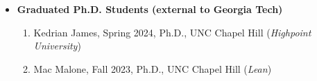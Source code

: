 \documentclass[11pt]{article}
\newcommand{\ignore}[1]{}
\newcommand{\bibgap}{\vspace{0.3\baselineskip}}
\begin{document}
\begin{itemize}
\begin{itemize}
\bibgap
\item {\bf Graduated Ph.D. Students (external to Georgia Tech)}
\begin{enumerate}
	\item Kedrian James, Spring 2024, Ph.D., UNC Chapel Hill ({\it Highpoint University})
	\item Mac Malone, Fall 2023, Ph.D., UNC Chapel Hill ({\it Lean})
\end{enumerate}

\ignore{
\item Scott Coull, Fall 2009, Ph.D., ({\it Mandiant})
\item Josh Mason, Fall 2009, Ph.D., ({\it Research Professor, UIUC})
\item Charles Wright, Spring 2008, Ph.D., ({\it Portland State University})
\item Seny Kamara, Spring 2008, Ph.D., ({\it Brown University})
\item Mho Abu Rajab (co-advised with A. Terzis), Ph.D., Spring 2008, ({\it Google})
\item Lucas Ballard, Spring 2008, Ph.D., ({\it Google})
\item Sophie Qui (co-advised with G. Mason), Ph.D., Spring 2007, ({\it Cisco Systems})
\item Srinivas Krishnan (co-advised with K. Jeffay), {\it Google}
\item John Lim (co-advised with Jan-Michael Frahm) {\it Salesforce}





}


\end{itemize}
\end{itemize}
\end{document}

